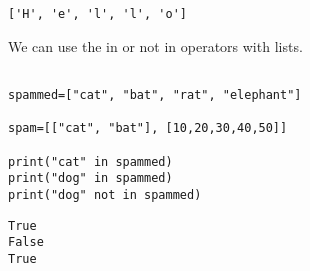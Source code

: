 \documentclass[11pt]{article}
\begin{document}
\begin{verbatim}
['H', 'e', 'l', 'l', 'o']
\end{verbatim}


We can use the in or not in operators with lists.


\begin{verbatim}

spammed=["cat", "bat", "rat", "elephant"]

spam=[["cat", "bat"], [10,20,30,40,50]]

print("cat" in spammed)
print("dog" in spammed)
print("dog" not in spammed)

\end{verbatim}

\begin{verbatim}
True
False
True
\end{verbatim}
\end{document}
